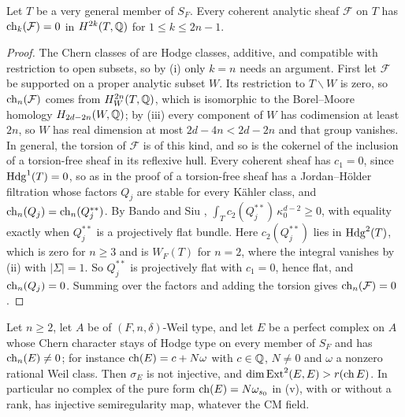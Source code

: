 \begin{proposition}
\label{prop:cmweiltorussheaves}
Let $T$ be a very general member of $S_{F}$. Every coherent analytic sheaf
$\mathcal{F}$ on $T$ has $\operatorname{ch}_{k}(\mathcal{F})=0$ in $H^{2k}(T,\mathbb{Q})$ for
$1\le k\le2n-1$.
\end{proposition}

\begin{proof}
The Chern classes of \cite{Gri10} are Hodge classes, additive, and
compatible with restriction to open subsets, so by
(i) only $k=n$ needs an argument. First let
$\mathcal{F}$ be supported on a proper analytic subset $W$. Its restriction to
$T\smallsetminus W$ is zero, so $\operatorname{ch}_{n}(\mathcal{F})$ comes from
$H^{2n}_{W}(T,\mathbb{Q})$, which is isomorphic to the Borel--Moore homology
$H_{2d-2n}(W,\mathbb{Q})$; by (iii) every component of $W$ has
codimension at least $2n$, so $W$ has real dimension at most $2d-4n<2d-2n$
and that group vanishes. In general, the torsion of $\mathcal{F}$ is of this
kind, and so is the cokernel of the inclusion of a torsion-free sheaf in its
reflexive hull. Every coherent sheaf has $c_{1}=0$, since $\mathrm{Hdg}^{1}(T)=0$, so
as in the proof of  a torsion-free sheaf has a
Jordan--H\"older filtration whose factors $Q_{j}$ are stable for every
K\"ahler class, and $\operatorname{ch}_{n}(Q_{j})=\operatorname{ch}_{n}(Q_{j}^{**})$. By Bando and Siu
\cite{BS94}, $\int_{T}c_{2}(Q_{j}^{**})\,\kappa_{0}^{d-2}\ge0$, with equality
exactly when $Q_{j}^{**}$ is a projectively flat bundle. Here
$c_{2}(Q_{j}^{**})$ lies in $\mathrm{Hdg}^{2}(T)$, which is zero for $n\ge3$ and is
$W_{F}(T)$ for $n=2$, where the integral vanishes by
(ii) with $|\Sigma|=1$. So $Q_{j}^{**}$ is projectively
flat with $c_{1}=0$, hence flat, and $\operatorname{ch}_{n}(Q_{j})=0$. Summing over the
factors and adding the torsion gives $\operatorname{ch}_{n}(\mathcal{F})=0$.
\end{proof}

\begin{theorem}
\label{thm:cmpurefalse}
Let $n\ge2$, let $A$ be of $(F,n,\delta)$-Weil type, and let $E$ be a
perfect complex on $A$ whose Chern character stays of Hodge type on every
member of $S_{F}$ and has $\operatorname{ch}_{n}(E)\ne0$; for instance
$\operatorname{ch}(E)=c+N\omega$ with $c\in\mathbb{Q}$, $N\ne0$ and $\omega$ a nonzero rational
Weil class. Then $\sigma_{E}$ is not injective, and
$\dim\operatorname{Ext}^{2}(E,E)>r(\operatorname{ch} E)$. In particular no complex of the pure form
$\operatorname{ch}(E)=N\omega_{s_{0}}$ in (v), with or without a
rank, has injective semiregularity map, whatever the CM field.
\end{theorem}

